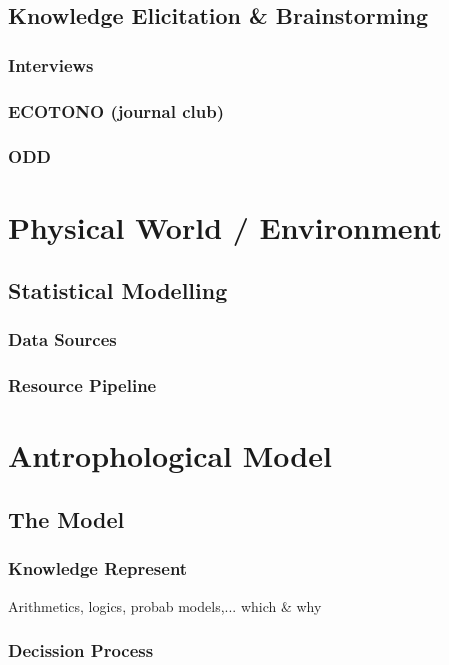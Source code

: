\documentclass{report}
\begin{document}
	    \subsection{Knowledge Elicitation \& Brainstorming}
		\subsubsection{Interviews}
		\subsubsection{ECOTONO (journal club)}
		\subsubsection{ODD}

	\section{Physical World / Environment}		%
		\subsection{Statistical Modelling}
			\subsubsection{Data Sources}
			\subsubsection{Resource Pipeline}

	\section{Antrophological Model}				%
		\subsection{The Model}
			\subsubsection{Knowledge Represent}
				Arithmetics, logics, probab models,... which \& why

			\subsubsection{Decission Process}
\end{document}
